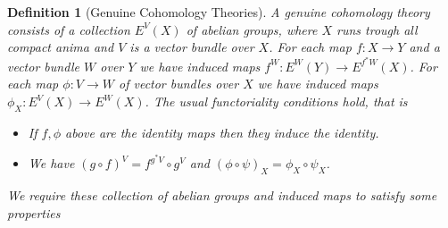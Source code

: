 \documentclass{article}
\newtheorem{definition}{Definition}
\begin{document}
\begin{definition}[Genuine Cohomology Theories]
  
    A \emph{genuine cohomology theory} consists of a collection
  $E^V(X)$ of abelian groups, where $X$ runs trough all compact anima and
  $V$ is a vector bundle over $X$.
  For each map $f \colon X \to Y$ and a vector bundle $W$ over $Y$ we have induced
  maps
  $f^W \colon E^{W}(Y) \to E^{f^*W}(X)$.
  For each map $\phi \colon V \to W$ of vector bundles over $X$ we have
  induced maps
  $\phi_X \colon E^{V}(X) \to E^{W}(X)$.
  The usual functoriality conditions hold, that is
  \begin{itemize}
    \item If $f, \phi$ above are the identity maps then they induce the identity.
    \item We have $(g \circ f)^V = f^{g^*V} \circ g^V$ and
    $(\phi \circ \psi)_X = \phi_X \circ \psi_X$.
  \end{itemize}
  
  We require these collection of abelian groups and induced maps to satisfy some
  properties
  

\end{definition}
\end{document}
